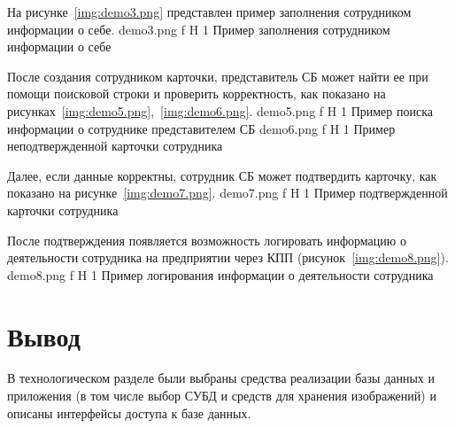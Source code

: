 На рисунке~\ref{img:demo3.png} представлен пример заполнения сотрудником информации о себе.
	{demo3.png}
	{f}
	{H}
	{1\textwidth}
	{Пример заполнения сотрудником информации о себе}
	
После создания сотрудником карточки, представитель СБ может найти ее при помощи поисковой строки и проверить корректность, как показано на рисунках~\ref{img:demo5.png},~\ref{img:demo6.png}.
	{demo5.png}
	{f}
	{H}
	{1\textwidth}
	{Пример поиска информации о сотруднике представителем СБ}
	{demo6.png}
	{f}
	{H}
	{1\textwidth}
	{Пример неподтвержденной карточки сотрудника}


Далее, если данные корректны, сотрудник СБ может подтвердить карточку, как показано на рисунке~\ref{img:demo7.png}.
	{demo7.png}
	{f}
	{H}
	{1\textwidth}
	{Пример подтвержденной карточки сотрудника}

После подтверждения появляется возможность логировать информацию о деятельности сотрудника на предприятии через КПП (рисунок~\ref{img:demo8.png}).
	{demo8.png}
	{f}
	{H}
	{1\textwidth}
	{Пример логирования информации о деятельности сотрудника}

\section{Вывод}

В технологическом разделе были выбраны средства реализации базы данных и приложения (в том числе выбор СУБД и средств для хранения изображений) и описаны интерфейсы доступа к базе данных.